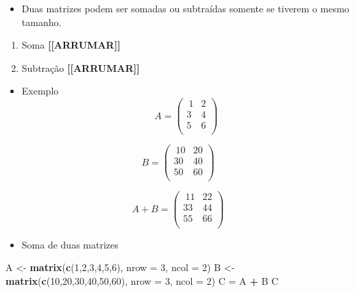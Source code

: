 \documentclass[
]{article}
\newenvironment{Shaded}{\begin{snugshade}}{\end{snugshade}}
\newcommand{\AttributeTok}[1]{\textcolor[rgb]{0.13,0.29,0.53}{#1}}
\newcommand{\DecValTok}[1]{\textcolor[rgb]{0.00,0.00,0.81}{#1}}
\newcommand{\FunctionTok}[1]{\textcolor[rgb]{0.13,0.29,0.53}{\textbf{#1}}}
\newcommand{\NormalTok}[1]{#1}
\newcommand{\OtherTok}[1]{\textcolor[rgb]{0.56,0.35,0.01}{#1}}
\newcommand{\SpecialCharTok}[1]{\textcolor[rgb]{0.81,0.36,0.00}{\textbf{#1}}}
\providecommand{\tightlist}{%
  \setlength{\itemsep}{0pt}\setlength{\parskip}{0pt}}
\begin{document}
\begin{itemize}
\tightlist
\item
  Duas matrizes podem ser somadas ou subtraídas somente se tiverem o
  mesmo tamanho.
\end{itemize}

\begin{enumerate}
\def\labelenumi{\arabic{enumi}.}
\tightlist
\item
  Soma \textbf{{[}{[}ARRUMAR{]}{]}}
\item
  Subtração \textbf{{[}{[}ARRUMAR{]}{]}}
\end{enumerate}

\begin{itemize}
\tightlist
\item
  Exemplo \[A = \begin{pmatrix}\
  1 & 2\\
  3 & 4\\
  5 & 6\\
  \end{pmatrix}\]
\end{itemize}

\[B = \begin{pmatrix}\
10 & 20\\
30 & 40\\
50 & 60\\
\end{pmatrix}\]

\[A + B = \begin{pmatrix}\
11 & 22\\
33 & 44\\
55 & 66\\
\end{pmatrix}\]

\begin{itemize}
\tightlist
\item
  Soma de duas matrizes
\end{itemize}

\begin{Shaded}
\begin{Highlighting}[]
\NormalTok{A }\OtherTok{\textless{}{-}} \FunctionTok{matrix}\NormalTok{(}\FunctionTok{c}\NormalTok{(}\DecValTok{1}\NormalTok{,}\DecValTok{2}\NormalTok{,}\DecValTok{3}\NormalTok{,}\DecValTok{4}\NormalTok{,}\DecValTok{5}\NormalTok{,}\DecValTok{6}\NormalTok{),}
\AttributeTok{nrow =} \DecValTok{3}\NormalTok{, }\AttributeTok{ncol =} \DecValTok{2}\NormalTok{)}
\NormalTok{B }\OtherTok{\textless{}{-}} \FunctionTok{matrix}\NormalTok{(}\FunctionTok{c}\NormalTok{(}\DecValTok{10}\NormalTok{,}\DecValTok{20}\NormalTok{,}\DecValTok{30}\NormalTok{,}\DecValTok{40}\NormalTok{,}\DecValTok{50}\NormalTok{,}\DecValTok{60}\NormalTok{),}
\AttributeTok{nrow =} \DecValTok{3}\NormalTok{, }\AttributeTok{ncol =} \DecValTok{2}\NormalTok{)}
\NormalTok{C }\OtherTok{=}\NormalTok{ A }\SpecialCharTok{+}\NormalTok{ B}
\NormalTok{C}
\end{Highlighting}
\end{Shaded}
\end{document}
